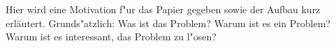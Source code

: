 
Hier wird eine Motivation f"ur das Papier gegeben sowie der Aufbau kurz 
erl\"autert.  Grunds"atzlich:  Was ist das Problem?  Warum ist es ein
Problem?  Warum ist es interessant, das Problem zu l"osen?
